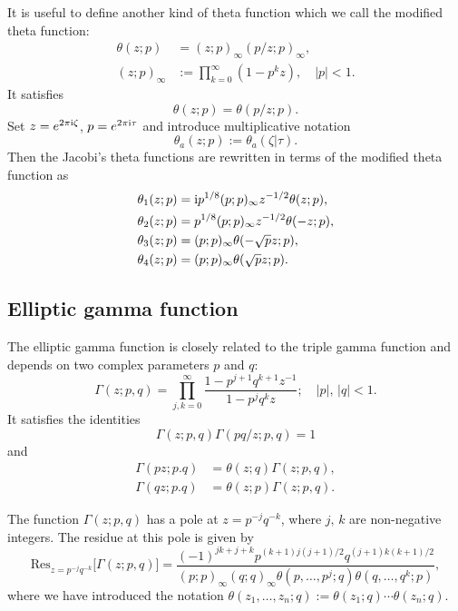 It is useful to define another kind of theta function which we call the modified theta function:
\begin{align}
    \theta(z;p) &= (z;p)_{\infty} (p/z;p)_{\infty}, \\
    (z;p)_{\infty} &:= \prod_{k=0}^{\infty} (1-p^k z), \quad |p|<1.
\end{align}
It satisfies\begin{equation}
    \theta(z;p) = \theta(p/z;p).
\end{equation}
Set $z=e^{2\pi\mathrm{i}\zeta}$, $p=e^{2\pi\mathrm{i}\tau}$ and introduce multiplicative notation
\begin{equation}
    \theta_a(z;p) := \theta_a(\zeta|\tau).
\end{equation}
Then the Jacobi's theta functions are rewritten in terms of the modified theta function as
\begin{align}
    \theta_1(z;p) &= \mathrm{i} p^{1/8} (p;p)_{\infty} z^{-1/2} \theta(z;p), \\
    \theta_2(z;p) &= p^{1/8} (p;p)_{\infty} z^{-1/2} \theta(-z;p), \\
    \theta_3(z;p) &= (p;p)_{\infty} \theta(-\sqrt{p}z;p), \\
    \theta_4(z;p) &= (p;p)_{\infty} \theta(\sqrt{p}z;p).
\end{align}





\subsection{Elliptic gamma function}

The elliptic gamma function is closely related to the triple gamma function
and depends on two complex parameters $p$ and $q$:
\begin{equation}
    \Gamma(z;p,q) =
        \prod_{j,k=0}^{\infty} \frac{1-p^{j+1}q^{k+1}z^{-1}}{1-p^j q^k z};
    \quad
        |p|,\,|q| < 1.
\end{equation}
It satisfies the identities
\begin{equation}
    \Gamma(z;p,q) \Gamma(pq/z;p,q) = 1
\end{equation}
and
\begin{align}
    \Gamma(pz;p.q) &= \theta(z;q) \Gamma(z;p,q), \\
    \Gamma(qz;p.q) &= \theta(z;p) \Gamma(z;p,q).
\end{align}

The function $\Gamma(z;p,q)$ has a pole at $z=p^{-j}q^{-k}$, where $j,\,k$ are non-negative integers.
The residue at this pole is given by
\begin{equation}
    \mathrm{Res}_{z=p^{-j}q^{-k}} \big[ \Gamma(z;p,q) \big]
    = \frac{(-1)^{jk+j+k}p^{(k+1)j(j+1)/2}q^{(j+1)k(k+1)/2}}
    {(p;p)_{\infty} (q;q)_{\infty} \theta(p,\ldots,p^j;q)\theta(q,\ldots,q^k;p)},
\label{eq:gamma_residue}
\end{equation}
where we have introduced the notation $\theta(z_1,\ldots,z_n;q):=\theta(z_1;q)\cdots\theta(z_n;q)$.

